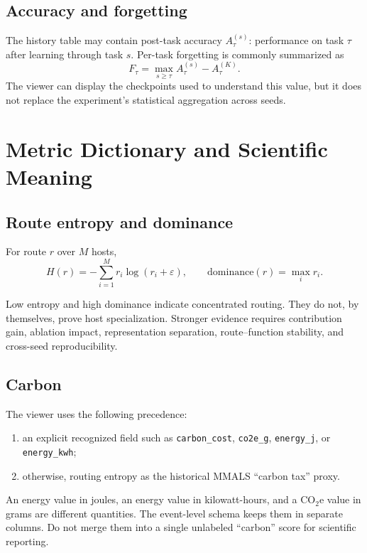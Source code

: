 \documentclass[11pt,a4paper]{article}
\newcommand{\code}[1]{\texttt{#1}}
\begin{document}
\subsection{Accuracy and forgetting}

The history table may contain post-task accuracy $A^{(s)}_\tau$: performance on task $\tau$ after learning through task $s$. Per-task forgetting is commonly summarized as
\[
  F_\tau = \max_{s\ge \tau} A^{(s)}_\tau - A^{(K)}_\tau.
\]
The viewer can display the checkpoints used to understand this value, but it does not replace the experiment's statistical aggregation across seeds.

\section{Metric Dictionary and Scientific Meaning}

\subsection{Route entropy and dominance}

For route $r$ over $M$ hosts,
\[
  H(r) = -\sum_{i=1}^{M} r_i\log(r_i+\varepsilon),
  \qquad
  \mathrm{dominance}(r)=\max_i r_i.
\]

Low entropy and high dominance indicate concentrated routing. They do not, by themselves, prove host specialization. Stronger evidence requires contribution gain, ablation impact, representation separation, route--function stability, and cross-seed reproducibility.

\subsection{Carbon}

The viewer uses the following precedence:

\begin{enumerate}
  \item an explicit recognized field such as \code{carbon\_cost}, \code{co2e\_g}, \code{energy\_j}, or \code{energy\_kwh};
  \item otherwise, routing entropy as the historical MMALS ``carbon tax'' proxy.
\end{enumerate}

\begin{warningbox}
An energy value in joules, an energy value in kilowatt-hours, and a CO$_2$e value in grams are different quantities. The event-level schema keeps them in separate columns. Do not merge them into a single unlabeled ``carbon'' score for scientific reporting.
\end{warningbox}
\end{document}
